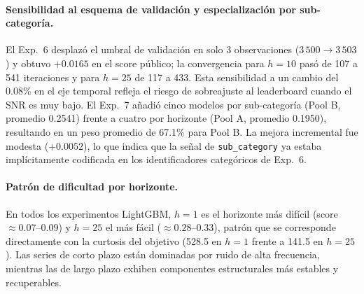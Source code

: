 \documentclass{article}
\begin{document}
\paragraph{Sensibilidad al esquema de validación y especialización por sub-categoría.}
El Exp.~6 desplazó el umbral de validación en solo 3 observaciones ($3\,500 \to 3\,503$) y obtuvo $+0.0165$ en el score público; la convergencia para $h=10$ pasó de 107 a 541 iteraciones y para $h=25$ de 117 a 433. Esta sensibilidad a un cambio del 0.08\% en el eje temporal refleja el riesgo de sobreajuste al leaderboard cuando el SNR es muy bajo. El Exp.~7 añadió cinco modelos por sub-categoría (Pool B, promedio 0.2541) frente a cuatro por horizonte (Pool A, promedio 0.1950), resultando en un peso promedio de 67.1\% para Pool B. La mejora incremental fue modesta ($+0.0052$), lo que indica que la señal de \texttt{sub\_category} ya estaba implícitamente codificada en los identificadores categóricos de Exp.~6.

\paragraph{Patrón de dificultad por horizonte.}
En todos los experimentos LightGBM, $h=1$ es el horizonte más difícil (score $\approx 0.07$--$0.09$) y $h=25$ el más fácil ($\approx 0.28$--$0.33$), patrón que se corresponde directamente con la curtosis del objetivo (528.5 en $h=1$ frente a 141.5 en $h=25$). Las series de corto plazo están dominadas por ruido de alta frecuencia, mientras las de largo plazo exhiben componentes estructurales más estables y recuperables.




\end{document}
